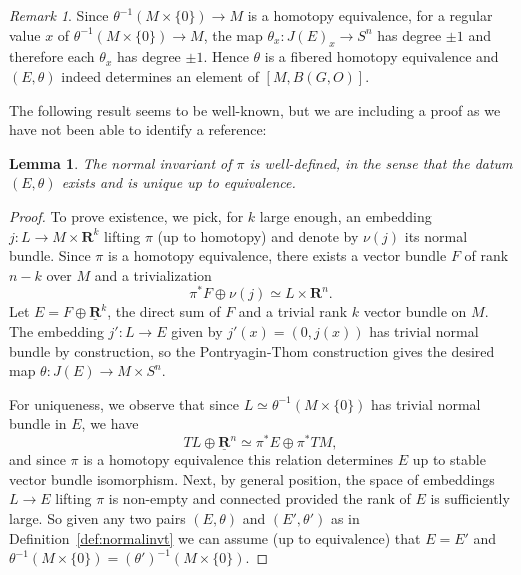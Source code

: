 \documentclass[reqno]{amsart}
\theoremstyle{theorem}
\newtheorem{lemma}[corollary]{Lemma}
\theoremstyle{remark}
\newtheorem{remark}[corollary]{Remark}
\theoremstyle{definition}
\newcommand{\R}{\mathbf{R}}
\begin{document}
\begin{remark}
Since $\theta^{-1}(M\times\{0\})\to M$ is a homotopy equivalence, for a regular value $x$ of
$\theta^{-1}(M\times\{0\})\to M$, the map $\theta_x : J(E)_x\to S^n$
has degree $\pm 1$ and therefore each $\theta_x$ has degree $\pm 1$. Hence $\theta$ is a fibered homotopy
equivalence and $(E,\theta)$ indeed determines an element of $[M,B(G,O)]$. 
\end{remark}
The following result seems to be well-known, but we are including a proof as we have not been able to identify a reference:
\begin{lemma}
The normal invariant of $\pi$ is well-defined, in the sense that the datum $(E,\theta)$ exists and is unique up to equivalence.  
\end{lemma}
\begin{proof}
To prove existence, we pick, for $k$ large enough, an embedding $j:L\to M\times \R^k$ lifting $\pi$ (up to homotopy)
and denote by $\nu(j)$ its normal bundle. Since $\pi$ is a homotopy equivalence, there exists a vector bundle $F$ of rank $n-k$ over $M$
and a trivialization
\[\pi^* F \oplus \nu(j) \simeq L\times \R^n.\]
Let $E=F \oplus \underline{\R}^k$, the direct sum of $F$ and a trivial rank $k$ vector bundle on $M$. The embedding $j':L\to E$ given by $j'(x)=(0,j(x))$ has trivial normal bundle by construction, so the Pontryagin-Thom construction gives the desired map
$\theta : J(E)\to M\times S^n$.


For uniqueness, we observe that since $L\simeq \theta^{-1}(M\times\{0\})$ has trivial normal bundle in $E$, we have
\[TL\oplus \underline{\R}^n\simeq \pi^*E \oplus \pi^*TM,\]
and since $\pi$ is a homotopy equivalence this relation determines $E$ up to stable vector bundle isomorphism.
Next, by general position, the space of embeddings $L\to E$ lifting $\pi$ is non-empty and connected provided
the rank of $E$ is sufficiently large. So given any two pairs $(E,\theta)$ and $(E',\theta')$ as in
Definition~\ref{def:normalinvt} we can assume (up to equivalence) that $E=E'$ and $\theta^{-1}(M\times\{0\})=(\theta')^{-1}(M\times\{0\})$.



\end{proof}
\end{document}
